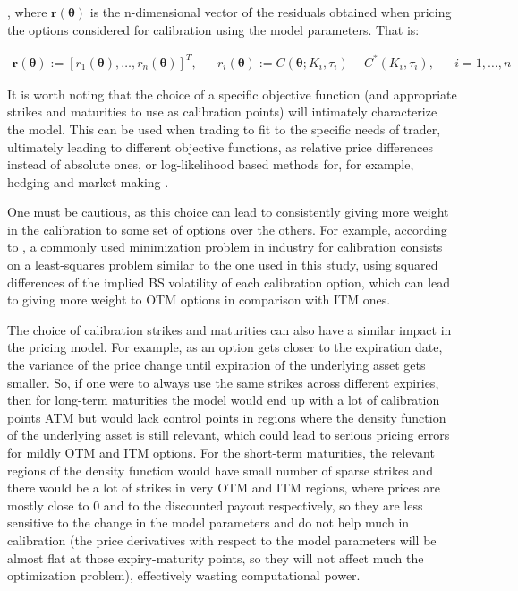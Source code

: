 \documentclass[12,twoside]{mammeTFM}
\theoremstyle{definition}
\theoremstyle{remark}
\begin{document}
, where $\boldsymbol{r}(\boldsymbol{\theta})$ is the n-dimensional vector of the residuals obtained when pricing the options considered for calibration using the model parameters. That is:

\begin{align}
\boldsymbol{r}(\boldsymbol{\theta}) := \left[r_1(\boldsymbol{\theta}), \ldots, r_n(\boldsymbol{\theta}) \right]^T, 
&& r_i(\boldsymbol{\theta}) :=  C(\boldsymbol{\theta}; K_i, \tau_i) - C^*(K_i, \tau_i), && i = 1, \ldots, n
\end{align}

It is worth noting that the choice of a specific objective function (and appropriate strikes and maturities to use as calibration points) will intimately characterize the model. This can be used when trading to fit to the specific needs of trader, ultimately leading to different objective functions, as relative price differences instead of absolute ones, or log-likelihood based methods \cite{jac00} for, for example, hedging and market making \cite{chr02}. 

One must be cautious, as this choice can lead to consistently giving more weight in the calibration to some set of options over the others. For example, according to \cite{cui17}, a commonly used minimization problem in industry for calibration consists on a least-squares problem similar to the one used in this study, using squared differences of the implied BS volatility of each calibration option, which can lead to giving more weight to OTM options in comparison with ITM ones.

The choice of calibration strikes and maturities can also have a similar impact in the pricing model. For example, as an option gets closer to the expiration date, the variance of the price change until expiration of the underlying asset gets smaller. So, if one were to always use the same strikes across different expiries, then for long-term maturities the model would end up with a lot of calibration points ATM but would lack control points in regions where the density function of the underlying asset is still relevant, which could lead to serious pricing errors for mildly OTM and ITM options. For the short-term maturities, the relevant regions of the density function would have small number of sparse strikes and there would be a lot of strikes in very OTM and ITM regions, where prices are mostly close to 0 and to the discounted payout respectively, so they are less sensitive to the change in the model parameters and do not help much in calibration (the price derivatives with respect to the model parameters will be almost flat at those expiry-maturity points, so they will not affect much the optimization problem), effectively wasting computational power.
\end{document}

